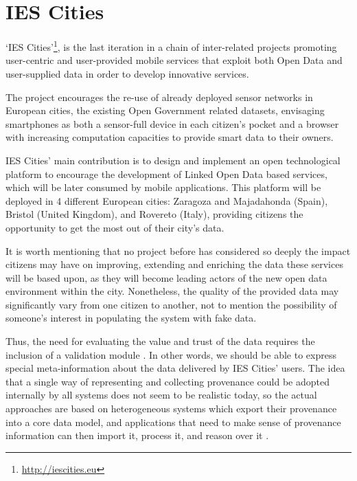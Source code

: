 \section{IES Cities}
\label{sec:ies_cities}

`IES Cities'\footnote{\url{http://iescities.eu}}, is the last iteration in a chain of inter-related projects promoting user-centric and user-provided mobile services that exploit both Open Data and user-supplied data in order to develop innovative services.

The project encourages the re-use of already deployed sensor networks in European cities, the existing Open Government related datasets, envisaging smartphones as both a sensor-full device in each citizen's pocket and a browser with increasing computation capacities to provide smart data to their owners.

IES Cities' main contribution is to design and implement an open technological platform to encourage the development of Linked Open Data based services, which will be later consumed by mobile applications. This platform will be deployed in 4 different European cities: Zaragoza and Majadahonda (Spain), Bristol (United Kingdom), and Rovereto (Italy), providing citizens the opportunity to get the most out of their city's data.

It is worth mentioning that no project before has considered so deeply the impact citizens may have on improving, extending and enriching the data these services will be based upon, as they will become leading actors of the new open data environment within the city. Nonetheless, the quality of the provided data may significantly vary from one citizen to another, not to mention the possibility of someone's interest in populating the system with fake data.

Thus, the need for evaluating the value and trust of the data requires the inclusion of a validation module \cite{hartig_publishing_2010}. In other words, we should be able to express special meta-information about the data delivered by IES Cities' users. The idea that a single way of representing and collecting provenance could be adopted internally by all systems does not seem to be realistic today, so the actual approaches are based on heterogeneous systems which export their provenance into a core data model, and applications that need to make sense of provenance information can then import it, process it, and reason over it \cite{ceolin_trust_2012}.


